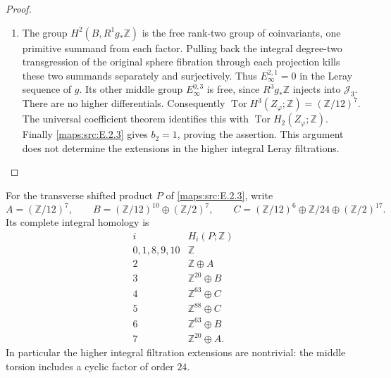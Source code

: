 \begin{proof}
\begin{enumerate}[label={$\langle1\rangle$\arabic*.},leftmargin=*]
\item The group \(H^2(B,R^1g_*\mathbb Z)\) is the free
rank-two group of coinvariants, one primitive summand from
each factor. Pulling back the integral degree-two
transgression of the original sphere fibration through each
projection kills these two summands separately and
surjectively. Thus \(E_\infty^{2,1}=0\) in the Leray
sequence of \(g\). Its other middle group
\(E_\infty^{0,3}\) is free, since \(R^3g_*\mathbb Z\)
injects into \(\mathcal J_3\). There are no higher
differentials. Consequently
\(\operatorname{Tor}H^3(Z_\varphi;\mathbb Z)
=(\mathbb Z/12)^7\). The universal coefficient theorem
identifies this with \(\operatorname{Tor}H_2(Z_\varphi;\mathbb Z)\).
Finally \ref{maps:src:E.2.3} gives \(b_2=1\), proving the assertion.
This argument does not determine the extensions in the
higher integral Leray filtrations.
\end{enumerate}
\end{proof}


\begin{theorem}\hypertarget{tag-02MQ}{}\label{maps:src:E.2.6}


For the transverse shifted product $P$ of \ref{maps:src:E.2.3}, write
\[
 A=(\mathbb Z/12)^7,\qquad
 B=(\mathbb Z/12)^{10}\oplus(\mathbb Z/2)^7,\qquad
 C=(\mathbb Z/12)^6\oplus\mathbb Z/24\oplus(\mathbb Z/2)^{17}.
\]
Its complete integral homology is
\[
 \begin{array}{c|l}
 i&H_i(P;\mathbb Z)\\\hline
 0,1,8,9,10&\mathbb Z\\
 2&\mathbb Z\oplus A\\
 3&\mathbb Z^{20}\oplus B\\
 4&\mathbb Z^{63}\oplus C\\
 5&\mathbb Z^{88}\oplus C\\
 6&\mathbb Z^{63}\oplus B\\
 7&\mathbb Z^{20}\oplus A.
 \end{array}
\]
In particular the higher integral filtration extensions are nontrivial:
the middle torsion includes a cyclic factor of order $24$.
\end{theorem}


